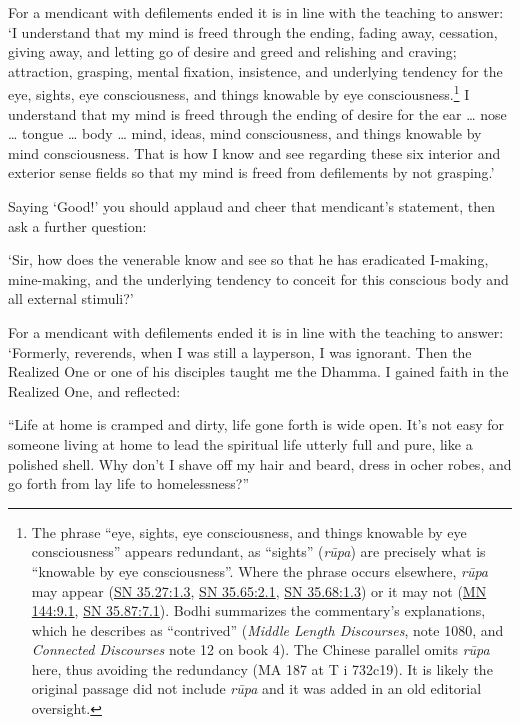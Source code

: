 \documentclass[12pt,openany]{book}%
\begin{document}
For a mendicant with defilements ended it is in line with the teaching to answer: ‘I understand that my mind is freed through the ending, fading away, cessation, giving away, and letting go of desire and greed and relishing and craving; attraction, grasping, mental fixation, insistence, and underlying tendency for the eye, sights, eye consciousness, and things knowable by eye consciousness.\footnote{The phrase “eye, sights, eye consciousness, and things knowable by eye consciousness” appears redundant, as “sights” (\textit{\textsanskrit{rūpa}}) are precisely what is “knowable by eye consciousness”. Where the phrase occurs elsewhere, \textit{\textsanskrit{rūpa}} may appear (\href{https://suttacentral.net/sn35.27/en/sujato\#1.3}{SN 35.27:1.3}, \href{https://suttacentral.net/sn35.65/en/sujato\#2.1}{SN 35.65:2.1}, \href{https://suttacentral.net/sn35.68/en/sujato\#1.3}{SN 35.68:1.3}) or it may not (\href{https://suttacentral.net/mn144/en/sujato\#9.1}{MN 144:9.1}, \href{https://suttacentral.net/sn35.87/en/sujato\#7.1}{SN 35.87:7.1}). Bodhi summarizes the commentary’s explanations, which he describes as “contrived” (\emph{Middle Length Discourses}, note 1080, and \emph{Connected Discourses} note 12 on book 4). The Chinese parallel omits \textit{\textsanskrit{rūpa}} here, thus avoiding the redundancy (MA 187 at T i 732c19). It is likely the original passage did not include \textit{\textsanskrit{rūpa}} and it was added in an old editorial oversight. } I understand that my mind is freed through the ending of desire for the ear … nose … tongue … body … mind, ideas, mind consciousness, and things knowable by mind consciousness. That is how I know and see regarding these six interior and exterior sense fields so that my mind is freed from defilements by not grasping.’ 

Saying ‘Good!’ you should applaud and cheer that mendicant’s statement, then ask a further question: 

‘Sir, how does the venerable know and see so that he has eradicated I-making, mine-making, and the underlying tendency to conceit for this conscious body and all external stimuli?’ 

For a mendicant with defilements ended it is in line with the teaching to answer: ‘Formerly, reverends, when I was still a layperson, I was ignorant. Then the Realized One or one of his disciples taught me the Dhamma. I gained faith in the Realized One, and reflected: 

“Life at home is cramped and dirty, life gone forth is wide open. It’s not easy for someone living at home to lead the spiritual life utterly full and pure, like a polished shell. Why don’t I shave off my hair and beard, dress in ocher robes, and go forth from lay life to homelessness?” 
\end{document}
